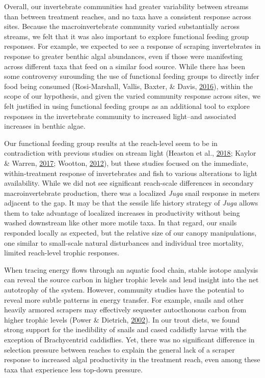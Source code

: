 \documentclass[double,12pt]{beavtex}
\begin{document}
  Overall, our invertebrate communities had greater variability between
  streams than between treatment reaches, and no taxa have a consistent
  response across sites. Because the macroinvertebrate community varied
  substantially across streams, we felt that it was also important to
  explore functional feeding group responses. For example, we expected to
  see a response of scraping invertebrates in response to greater benthic
  algal abundances, even if those were manifesting across different taxa
  that feed on a similar food source. While there has been some
  controversy surounding the use of functional feeding groups to directly
  infer food being consumed (Rosi-Marshall, Vallis, Baxter, \& Davis,
  \protect\hyperlink{ref-Rosi2016}{2016}), within the scope of our
  hypothesis, and given the varied community response across sites, we
  felt justified in using functional feeding groups as an additional tool
  to explore responses in the invertebrate community to increased
  light--and associated increases in benthic algae.
  
  Our functional feeding group results at the reach-level seem to be in
  contradiction with previous studies on stream light (Heaston et al.,
  \protect\hyperlink{ref-Heaston2018}{2018}; Kaylor \& Warren,
  \protect\hyperlink{ref-Kaylor2017Eco}{2017}; Wootton,
  \protect\hyperlink{ref-Wootton2012}{2012}), but these studies focused on
  the immediate, within-treatment response of invertebrates and fish to
  various alterations to light availability. While we did not see
  significant reach-scale differences in secondary macroinvertebrate
  production, there was a localized \emph{Juga} snail response in meters
  adjacent to the gap. It may be that the sessile life history strategy of
  \emph{Juga} allows them to take advantage of localized increases in
  productivity without being washed downstream like other more motile
  taxa. In that regard, our snails responded locally as expected, but the
  relative size of our canopy manipulations, one similar to small-scale
  natural disturbances and individual tree mortality, limited reach-level
  trophic responses.
  
  When tracing energy flows through an aquatic food chain, stable isotope
  analysis can reveal the source carbon in higher trophic levels and lend
  insight into the net autotrophy of the system. However, community
  studies have the potential to reveal more subtle patterns in energy
  transfer. For example, snails and other heavily armored scrapers may
  effectively sequester autocthonous carbon from higher trophic levels
  (Power \& Dietrich, \protect\hyperlink{ref-Power2002}{2002}). In our
  trout diets, we found strong support for the inedibility of snails and
  cased caddisfly larvae with the exception of Brachycentrid caddisflies.
  Yet, there was no significant difference in selection pressure between
  reaches to explain the general lack of a scraper response to increased
  algal productivity in the treatment reach, even among these taxa that
  experience less top-down pressure.
  
\end{document}
